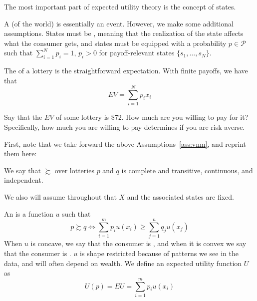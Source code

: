 \documentclass[12pt]{article}
\begin{document}
The most important part of expected utility theory is the concept of states. 

\begin{definition}
	A  (of the world) is essentially an event. However, we make some additional assumptions. States must be , meaning that the realization of the state affects what the consumer gets, and states must be equipped with a probability $p \in \mathcal{P}$ such that $\sum_{i=1}^N p_i = 1$, $p_i > 0$ for payoff-relevant states $\{s_1,\dots,s_N\}$.
\end{definition}

\begin{definition}
	The  of a lottery is the straightforward expectation. With finite payoffs, we have that
	\[
	EV = \sum_{i=1}^N p_i x_i
	\]
\end{definition}

\begin{question}
	Say that the $EV$ of some lottery is \$72. How much are you willing to pay for it? Specifically, how much you are willing to pay determines if you are risk averse.
\end{question}

First, note that we take forward the above Assumptions~\ref{ass:vnm}, and reprint them here:

\begin{assumption}\label{ass:vnm_5}
	We say that $\succsim$ over lotteries $p$ and $q$ is complete and transitive, continuous, and independent.
\end{assumption}

We also will assume throughout that $X$ and the associated states are fixed.

\begin{definition}
	An  is a function $u$ such that
	\[
	p \succsim q \Longleftrightarrow \sum_{i=1}^m p_i u(x_i) \ge \sum_{j=1}^n q_j u(x_j)
	\]
	When $u$ is concave, we say that the consumer is , and when it is convex we say that the consumer is . $u$ is shape restricted because of patterns we see in the data, and will often depend on wealth. We define an expected utility function $U$ as
	\[
	U(p) = EU = \sum_{i=1}^m p_i u(x_i)
	\]
\end{definition}
\end{document}
